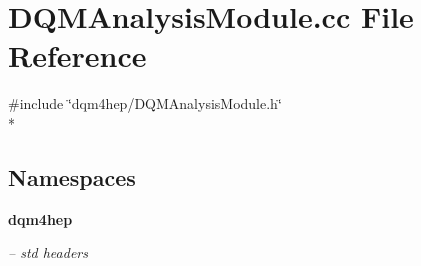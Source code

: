 \section{D\+Q\+M\+Analysis\+Module.\+cc File Reference}
\label{DQMAnalysisModule_8cc}
{\ttfamily \#include \char`\"{}dqm4hep/\+D\+Q\+M\+Analysis\+Module.\+h\char`\"{}}\\*
\subsection*{Namespaces}
\begin{DoxyCompactItemize}
\item 
 {\bf dqm4hep}
\begin{DoxyCompactList}\small\item\em -- std headers \end{DoxyCompactList}\end{DoxyCompactItemize}
